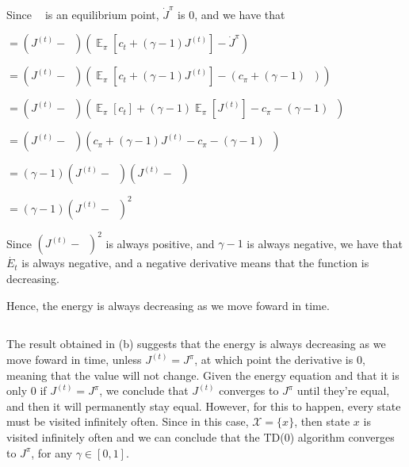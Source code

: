 \documentclass{article}
\DeclareMathOperator{\EX}{\mathbb{E}}%
\DeclareMathOperator{\JPI}{J^\pi} %
\begin{document}
\medskip

Since $\JPI$ is an equilibrium point, $\dot{J}^\pi$ is 0, and we have that

\medskip

$ = \left(J^{(t)} - \JPI \right) (\EX_\pi[c_t + (\gamma - 1) J^{(t)}] - \dot{J}^\pi)$

$ = \left(J^{(t)} - \JPI \right) (\EX_\pi[c_t + (\gamma - 1) J^{(t)}] - (c_\pi + (\gamma - 1) \JPI))$

$ = \left(J^{(t)} - \JPI \right) (\EX_\pi[c_t] + (\gamma - 1) \EX_\pi[J^{(t)}] - c_\pi - (\gamma - 1) \JPI)$

$ = \left(J^{(t)} - \JPI \right) (c_\pi +  (\gamma - 1) J^{(t)} - c_\pi - (\gamma - 1) \JPI)$

$ = (\gamma - 1) \left(J^{(t)} - \JPI \right) (J^{(t)} - \JPI)$

$ = (\gamma - 1) \left(J^{(t)} - \JPI \right)^2$

\bigskip

Since $\left(J^{(t)} - \JPI \right)^2$ is always positive, and $\gamma - 1$ is always negative, 
we have that $\dot{E_t}$ is always negative, and a negative derivative means that the function is decreasing. 

Hence, the energy is always decreasing as we move foward in time.
\subsection{}

The result obtained in (b) suggests that the energy is always decreasing as we move foward in time, unless $J^{(t)} = J^{\pi}$, 
at which point the derivative is 0, meaning that the value will not change.
Given the energy equation and that it is only 0 if $J^{(t)} = J^{\pi}$, we conclude that $J^{(t)}$ converges to $J^{\pi}$
until they're equal, and then it will permanently stay equal.
However, for this to happen, every state must be visited infinitely often. Since in this case, $\mathcal{X} = \{x\}$, 
then state $x$ is visited infinitely often and we can conclude 
that the TD(0) algorithm converges to $J^{\pi}$, for any $\gamma \in [0, 1]$.
\end{document}
